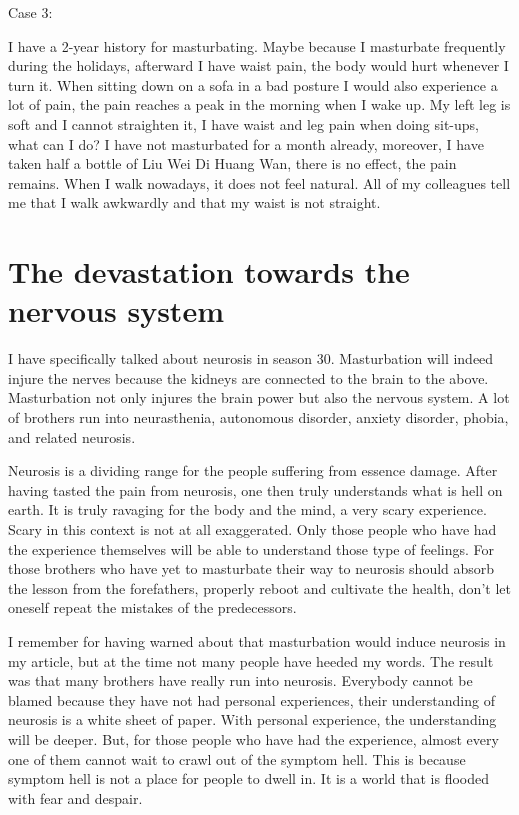 \documentclass[
]{book}
\begin{document}
Case 3:

I have a 2-year history for masturbating. Maybe because I masturbate frequently during the holidays, afterward I have waist pain, the body would hurt whenever I turn it. When sitting down on a sofa in a bad posture I would also experience a lot of pain, the pain reaches a peak in the morning when I wake up. My left leg is soft and I cannot straighten it, I have waist and leg pain when doing sit-ups, what can I do? I have not masturbated for a month already, moreover, I have taken half a bottle of Liu Wei Di Huang Wan, there is no effect, the pain remains. When I walk nowadays, it does not feel natural. All of my colleagues tell me that I walk awkwardly and that my waist is not straight.

\hypertarget{the-devastation-towards-the-nervous-system}{%
\section{The devastation towards the nervous system}\label{the-devastation-towards-the-nervous-system}}

I have specifically talked about neurosis in season 30. Masturbation will indeed injure the nerves because the kidneys are connected to the brain to the above. Masturbation not only injures the brain power but also the nervous system. A lot of brothers run into neurasthenia, autonomous disorder, anxiety disorder, phobia, and related neurosis.

Neurosis is a dividing range for the people suffering from essence damage. After having tasted the pain from neurosis, one then truly understands what is hell on earth. It is truly ravaging for the body and the mind, a very scary experience. Scary in this context is not at all exaggerated. Only those people who have had the experience themselves will be able to understand those type of feelings. For those brothers who have yet to masturbate their way to neurosis should absorb the lesson from the forefathers, properly reboot and cultivate the health, don't let oneself repeat the mistakes of the predecessors.

I remember for having warned about that masturbation would induce neurosis in my article, but at the time not many people have heeded my words. The result was that many brothers have really run into neurosis. Everybody cannot be blamed because they have not had personal experiences, their understanding of neurosis is a white sheet of paper. With personal experience, the understanding will be deeper. But, for those people who have had the experience, almost every one of them cannot wait to crawl out of the symptom hell. This is because symptom hell is not a place for people to dwell in. It is a world that is flooded with fear and despair.
\end{document}
